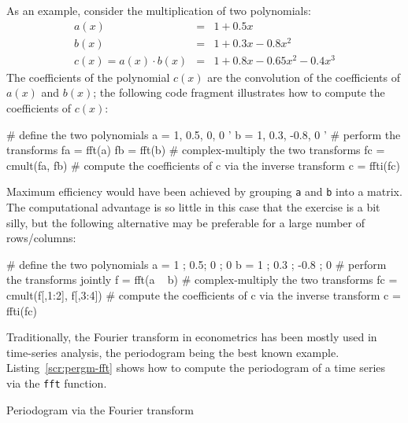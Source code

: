 As an example, consider the multiplication of two polynomials:
\begin{eqnarray*}
  a(x) & = & 1 + 0.5 x \\
  b(x) & = & 1 + 0.3 x - 0.8 x^2 \\
  c(x) = a(x) \cdot b(x) & = & 1 + 0.8 x - 0.65 x^2 - 0.4 x^3
\end{eqnarray*}
The coefficients of the polynomial $c(x)$ are the convolution of the
coefficients of $a(x)$ and $b(x)$; the following  code fragment
illustrates how to compute the coefficients of $c(x)$:
\begin{code}
# define the two polynomials
a = { 1, 0.5, 0, 0 }'
b = { 1, 0.3, -0.8, 0 }'
# perform the transforms
fa = fft(a)
fb = fft(b)
# complex-multiply the two transforms 
fc = cmult(fa, fb)
# compute the coefficients of c via the inverse transform
c = ffti(fc)
\end{code}

Maximum efficiency would have been achieved by grouping \texttt{a} and
\texttt{b} into a matrix.  The computational advantage is so little in
this case that the exercise is a bit silly, but the following
alternative may be preferable for a large number of
rows/columns:
\begin{code}
# define the two polynomials
a = { 1 ; 0.5; 0 ; 0 }
b = { 1 ; 0.3 ; -0.8 ; 0 }
# perform the transforms jointly
f = fft(a ~ b)
# complex-multiply the two transforms 
fc = cmult(f[,1:2], f[,3:4])
# compute the coefficients of c via the inverse transform
c = ffti(fc)
\end{code}

Traditionally, the Fourier transform in econometrics has been mostly
used in time-series analysis, the periodogram being the best known
example. Listing~\ref{scr:pergm-fft} shows how to compute the
periodogram of a time series via the \texttt{fft} function.

\begin{script}[htbp]
  \caption{Periodogram via the Fourier transform}
  \label{scr:pergm-fft}
\end{script}



